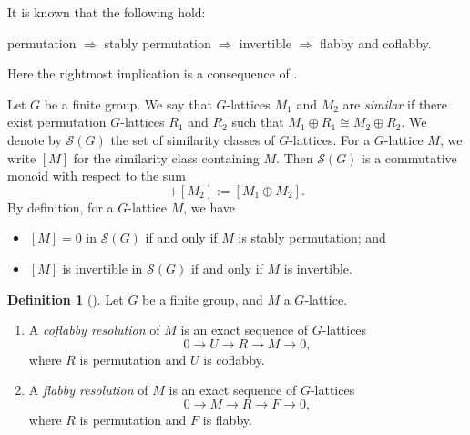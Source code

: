 \documentclass[12pt]{amsart}
\theoremstyle{plain}
\theoremstyle{definition}
\newtheorem{dfn}[thm]{Definition}
\numberwithin{thm}{section}
\numberwithin{equation}{section}
\newcommand{\sS}{\mathscr{S}}
\begin{document}
It is known that the following hold: 
\begin{center}
    permutation $\Rightarrow$ stably permutation $\Rightarrow$ invertible $\Rightarrow$ flabby and coflabby. 
\end{center}
Here the rightmost implication is a consequence of \cite[(1.1) Proposition]{Lenstra1974}. 

\vspace{6pt}
Let $G$ be a finite group. We say that $G$-lattices $M_{1}$ and $M_{2}$ are \emph{similar} if there exist permutation $G$-lattices $R_{1}$ and $R_{2}$ such that $M_{1}\oplus R_{1}\cong M_{2}\oplus R_{2}$. We denote by $\sS(G)$ the set of similarity classes of $G$-lattices. For a $G$-lattice $M$, we write $[M]$ for the similarity class containing $M$. Then $\sS(G)$ is a commutative monoid with respect to the sum
\begin{equation*}
    [M_{1}]+[M_{2}]:=[M_{1}\oplus M_{2}]. 
\end{equation*}
By definition, for a $G$-lattice $M$, we have 
\begin{itemize}
    \item $[M]=0$ in $\sS(G)$ if and only if $M$ is stably permutation; and
    \item $[M]$ is invertible in $\sS(G)$ if and only if $M$ is invertible. 
\end{itemize}

\begin{dfn}[{\cite[\S 2.6]{Lorenz2005}}]
Let $G$ be a finite group, and $M$ a $G$-lattice. 
\begin{enumerate}
\item A \emph{coflabby resolution} of $M$ is an exact sequence of $G$-lattices
\begin{equation*}
0\rightarrow U \rightarrow R \rightarrow M \rightarrow 0, 
\end{equation*}
where $R$ is permutation and $U$ is coflabby. 
\item A \emph{flabby resolution} of $M$ is an exact sequence of $G$-lattices
\begin{equation*}
0\rightarrow M \rightarrow R \rightarrow F \rightarrow 0, 
\end{equation*}
where $R$ is permutation and $F$ is flabby. 
\end{enumerate}
\end{dfn}
\end{document}
